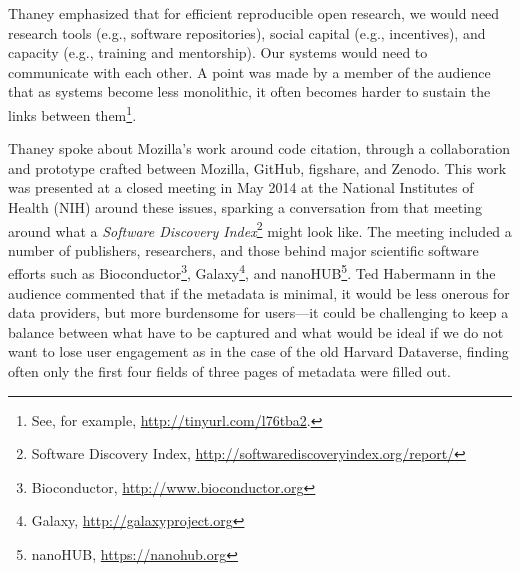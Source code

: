 \documentclass[11pt, oneside]{amsart}
\begin{document}
\begin{comment}
(Kaitlin didn't really say why? Were the tools used? Did they immediately
bit-rot? Was their development unsustained?)-should ask question about this. Is
there a caBIG report available? Quotes from Andrea Califano/Joe Gray, looks like
there is: \url{http://tinyurl.com/qdodbo7}.

What do we mean by open research? In regard to community/technology/practices

Inefficiency cartoon:  \url{http://www.xkcd.com/1445/}.
\end{comment}

Thaney emphasized that for efficient reproducible open research, we would need
research tools (e.g., software repositories), social capital (e.g., incentives),
and capacity (e.g., training and mentorship). Our systems would need to
communicate with each other. A point was made by a member of the audience that
as systems become less monolithic, it often becomes harder to sustain the links
between them\footnote{See, for example, \url{http://tinyurl.com/l76tba2}.}.

Thaney spoke about Mozilla's work around code citation, through a collaboration
and prototype crafted between Mozilla, GitHub, figshare, and Zenodo. This work
was presented at a closed meeting in May 2014 at the National Institutes of
Health (NIH) around these issues, sparking a conversation from that meeting
around what a \emph{Software Discovery
Index}\footnote{Software Discovery Index, \url{http://softwarediscoveryindex.org/report/}} might look
like. The meeting included a number of publishers, researchers, and those behind
major scientific software efforts such as
Bioconductor\footnote{Bioconductor, \url{http://www.bioconductor.org}},
Galaxy\footnote{Galaxy, \url{http://galaxyproject.org}}, and
nanoHUB\footnote{nanoHUB, \url{https://nanohub.org}}.
Ted Habermann in the audience commented that if the metadata is minimal, it
would be less onerous for data providers, but more burdensome for users---it
could be challenging to keep a balance between what have to be captured and what
would be ideal if we do not want to lose user engagement as in the case of the
old Harvard Dataverse, finding often only the first four fields of three pages
of metadata were filled out.
\end{document}
